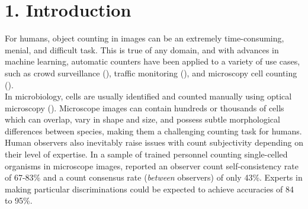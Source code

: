 
\chapter{1. Introduction}
\label{chap:intro}
For humans, object counting in images can be an extremely time-consuming, menial, and difficult task. This is true of any domain, and with advances in machine learning, automatic counters have been applied to a variety of use cases, such as crowd surveillance (\cite{Zhang_2016_CVPR}), traffic monitoring (\cite{Zhang_2017_ICCV}), and microscopy cell counting (\cite{Identification-and-enumeration-of-cyanobacteria,xie2018microscopy}).\\

In microbiology, cells are usually identified and counted manually using optical microscopy (\cite{Identification-and-enumeration-of-cyanobacteria}). Microscope images can contain hundreds or thousands of cells which can overlap, vary in shape and size, and possess subtle morphological differences between species, making them a challenging counting task for humans. Human observers also inevitably raise issues with count subjectivity depending on their level of expertise. In a sample of trained personnel counting single-celled organisms in microscope images, \cite{Do-experts-make-mistakes} reported an observer count self-consistency rate of 67-83\% and a count consensus rate (\textit{between} observers) of only 43\%. Experts in making particular discriminations could be expected to achieve accuracies of 84 to 95\%.\\

